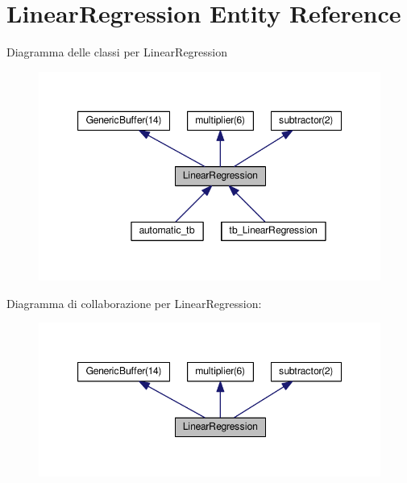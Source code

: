 \hypertarget{class_linear_regression}{\section{Linear\+Regression Entity Reference}
\label{class_linear_regression}
}


Diagramma delle classi per Linear\+Regression\nopagebreak
\begin{figure}[H]
\begin{center}
\leavevmode
\includegraphics[width=347pt]{class_linear_regression__inherit__graph}
\end{center}
\end{figure}


Diagramma di collaborazione per Linear\+Regression\+:\nopagebreak
\begin{figure}[H]
\begin{center}
\leavevmode
\includegraphics[width=347pt]{class_linear_regression__coll__graph}
\end{center}
\end{figure}
